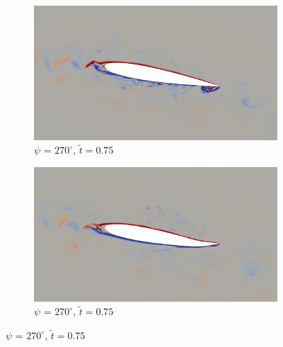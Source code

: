 \begin{figure}[H]\ContinuedFloat
	\centering
	
	\begin{subfigure}[b]{0.4\textwidth}
		\centering
		\includegraphics[width=1\textwidth]{figures/zonal_adapt_results/AC/mu_1pt5/baseline/phase_270.png}
		\caption{ $\psi$ = $270^\circ$, $\tilde{t}=0.75$}
		\label{fig:mu_1pt5_baseline_psi270}
	\end{subfigure}
	\begin{subfigure}[b]{0.4\textwidth}
		\centering
		\includegraphics[width=1\textwidth]{figures/zonal_adapt_results/AC/mu_1pt5/AC/phase_270.png}
		\caption{ $\psi$ = $270^\circ$, $\tilde{t}=0.75$}
		\label{fig:mu_1pt5_AC_psi270}
	\end{subfigure}
	

\end{figure}
